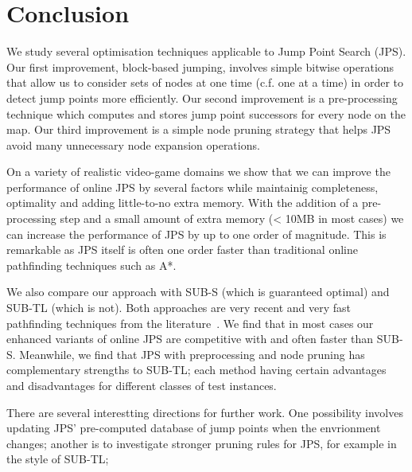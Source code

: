 \section{Conclusion}
\label{sec::conclusion}
We study several optimisation techniques applicable to Jump Point Search (JPS).
Our first improvement, block-based jumping, involves simple bitwise
operations that allow us to consider sets of nodes at one time (c.f. one
at a time) in order to detect jump points more efficiently. Our second
improvement is a pre-processing technique which computes and stores jump point
successors for every node on the map. Our third improvement is a simple node
pruning strategy that helps JPS avoid many unnecessary node expansion operations.

On a variety of realistic video-game domains we show that we can improve 
the performance of online JPS by several factors while maintainig
completeness, optimality and adding little-to-no extra memory. With the addition
of a pre-processing step and a small amount of extra memory (< 10MB in most cases) 
we can increase the performance of JPS by up to one order of magnitude.  This is
remarkable as JPS itself is often one order faster than traditional online 
pathfinding techniques such as A*.

We also compare our approach with SUB-S (which is guaranteed optimal) and SUB-TL 
(which is not). Both approaches are very recent and very fast pathfinding techniques from the 
literature~\cite{uras13}. We find that in most cases our enhanced variants of online 
JPS are competitive with and often faster than SUB-S. Meanwhile, we find that JPS with
preprocessing and node pruning has complementary strengths to SUB-TL; each method having
certain advantages and disadvantages for different classes of test instances.

There are several interestting directions for further work. One possibility involves
updating JPS' pre-computed database of jump points when the envrionment changes; another 
is to investigate stronger pruning rules for JPS, for example in the style of SUB-TL;
